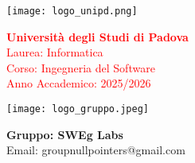\begin{minipage}{0.4\textwidth}
    \texttt{[image: logo\_unipd.png]}
\end{minipage}
\begin{minipage}{0.55\textwidth}
    \textcolor{red}{\textbf{Università degli Studi di Padova}} \\
    \textcolor{red}{Laurea: Informatica} \\
    \textcolor{red}{Corso: Ingegneria del Software} \\
    \textcolor{red}{Anno Accademico: 2025/2026}
\end{minipage}

\begin{minipage}{0.4\textwidth}
    \texttt{[image: logo\_gruppo.jpeg]}
\end{minipage}
\begin{minipage}{0.55\textwidth}
    \textbf{Gruppo: SWEg Labs} \\
    Email: \textsf{groupnullpointers@gmail.com}
\end{minipage}

\vspace{2cm}
